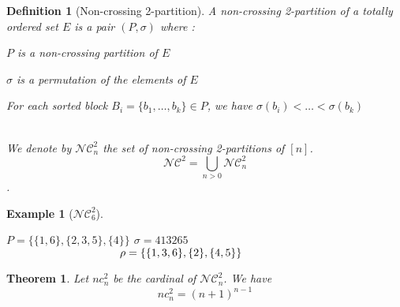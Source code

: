 \documentclass[12pt]{report}
\newtheorem{theorem}{Theorem}
\newtheorem{definition}{Definition}
\newtheorem*{example}{Example}
\begin{document}
\begin{definition}[Non-crossing 2-partition]
    A \emph{non-crossing 2-partition} of a \emph{totally
    ordered} set $E$ is a pair $(P, \sigma)$
    where :\\
    \begin{itemize*}
        \item $P$ is a non-crossing partition of $E$\\
        \item $\sigma$ is a permutation of the elements of $E$\\
        \item For each \emph{sorted} block
            $B_i = \{b_1, \ldots, b_k\} \in P$, we have
            $\sigma (b_i) < \ldots < \sigma (b_k)$\\\\
    \end{itemize*}
    We denote by $\mathcal{NC}^2_n$ the set of non-crossing
    2-partitions of $[n]$.
    $$\mathcal{NC}^2 = \bigcup_{n > 0}{\mathcal{NC}^2_n}$$.
\end{definition}

\begin{example}[$\mathcal{NC}^2_6$]
    \begin{itemize*}
            \subitem $P = \{\{1, 6\}, \{2, 3, 5\}, \{4\}\}$
            \subitem $\sigma = 413265$ \\
            \subitem $\hspace{36mm} \rho = \{\{1, 3, 6\}, \{2\}, \{4, 5\}\}$
    \end{itemize*}    
\end{example}

\begin{theorem}
    Let $nc^2_n$ be the cardinal of $\mathcal{NC}^2_n$.
    We have $$nc^2_n = (n + 1)^{n-1}$$
\end{theorem}
\end{document}
